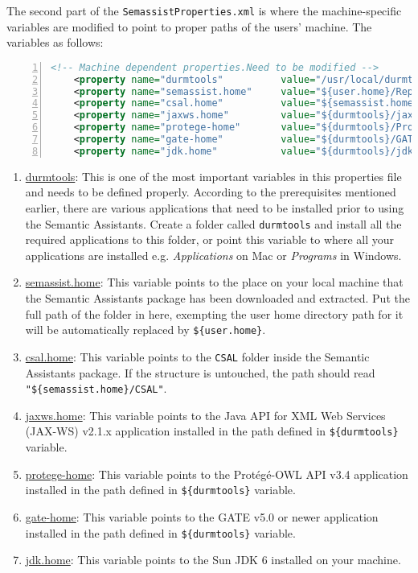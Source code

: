 The second part of the \texttt{SemassistProperties.xml} is where the
machine-specific variables are modified to point to proper paths of
the users' machine. The variables as follows:
\begin{lstlisting}[language=XML,numbers=left,xleftmargin=8mm,columns=flexible]
    <!-- Machine dependent properties.Need to be modified -->
    <property name="durmtools"          value="/usr/local/durmtools" />
    <property name="semassist.home"     value="${user.home}/Repository/semantic-assist" />
    <property name="csal.home"          value="${semassist.home}/CSAL" />
    <property name="jaxws.home"         value="${durmtools}/jaxws-ri" />
    <property name="protege-home"       value="${durmtools}/Protege" />
    <property name="gate-home"          value="${durmtools}/GATE/gate" />
    <property name="jdk.home"           value="${durmtools}/jdk" />
\end{lstlisting}

\begin{enumerate}
\item \url{durmtools}: This is one of the most important variables in this properties file and needs to be defined properly. According to the prerequisites mentioned earlier, there are various applications that need to be installed prior to using the Semantic Assistants.
Create a folder called \texttt{durmtools} and install all the required applications to this folder, or point this variable to where all your applications are installed e.g. \emph{Applications} on Mac or \emph{Programs} in Windows.
\item \url{semassist.home}: This variable points to the place on your local machine that the Semantic Assistants package has been downloaded and extracted. Put the full path of the folder in here, exempting the user home directory path for it will be automatically replaced by \texttt{\$\{user.home\}}.
\item \url{csal.home}: This variable points to the \texttt{CSAL} folder inside the Semantic Assistants package. If the structure is untouched, the path should read \texttt{"\$\{semassist.home\}/CSAL"}.
\item \url{jaxws.home}: This variable points to the Java API for XML Web Services (JAX-WS) v2.1.x application installed in the path defined in \texttt{\$\{durmtools\}} variable.
\item \url{protege-home}: This variable points to the Prot\'{e}g\'{e}-OWL API v3.4 application installed in the path defined in \texttt{\$\{durmtools\}} variable.
\item \url{gate-home}: This variable points to the GATE v5.0 or newer application installed in the path defined in \texttt{\$\{durmtools\}} variable.
\item \url{jdk.home}: This variable points to the Sun JDK 6 installed on your machine.
\end{enumerate}


